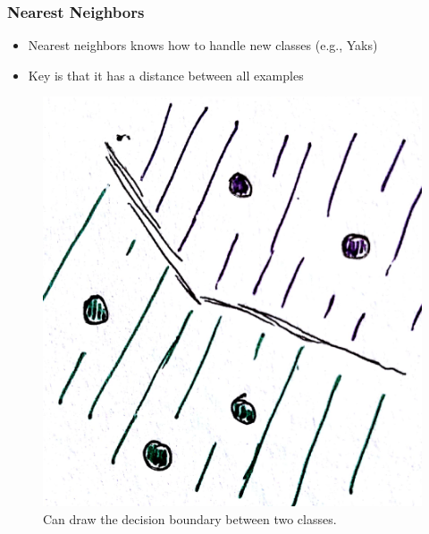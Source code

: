\documentclass[10pt,mathserif]{beamer}
\begin{document}
\begin{frame}
  \frametitle{Nearest Neighbors}
 \begin{itemize}
 \item Nearest neighbors knows how to handle new classes (e.g., Yaks)
 \item Key is that it has a distance between all examples
 \end{itemize} 
\begin{figure}[ht]
  \centering
  \includegraphics[width=0.40\paperwidth]{figure/nneighbor_2}
  \caption{Can draw the decision boundary between two classes. \label{fig:nneighbor_2} }
\end{figure}
\end{frame}
\end{document}
